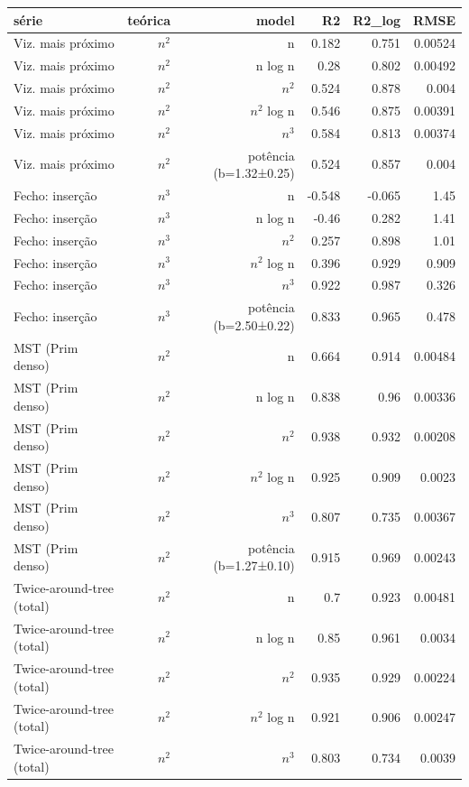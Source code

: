 \begin{tabular}{lrrrrr}
\hline
série & teórica & model & R2 & R2\_log & RMSE \\
\hline
Viz. mais próximo & $n^{2}$ & n & 0.182 & 0.751 & 0.00524 \\
Viz. mais próximo & $n^{2}$ & n log n & 0.28 & 0.802 & 0.00492 \\
Viz. mais próximo & $n^{2}$ & $n^{2}$ & 0.524 & 0.878 & 0.004 \\
Viz. mais próximo & $n^{2}$ & $n^{2}$ log n & 0.546 & 0.875 & 0.00391 \\
Viz. mais próximo & $n^{2}$ & $n^{3}$ & 0.584 & 0.813 & 0.00374 \\
Viz. mais próximo & $n^{2}$ & potência (b=1.32±0.25) & 0.524 & 0.857 & 0.004 \\
Fecho: inserção & $n^{3}$ & n & -0.548 & -0.065 & 1.45 \\
Fecho: inserção & $n^{3}$ & n log n & -0.46 & 0.282 & 1.41 \\
Fecho: inserção & $n^{3}$ & $n^{2}$ & 0.257 & 0.898 & 1.01 \\
Fecho: inserção & $n^{3}$ & $n^{2}$ log n & 0.396 & 0.929 & 0.909 \\
Fecho: inserção & $n^{3}$ & $n^{3}$ & 0.922 & 0.987 & 0.326 \\
Fecho: inserção & $n^{3}$ & potência (b=2.50±0.22) & 0.833 & 0.965 & 0.478 \\
MST (Prim denso) & $n^{2}$ & n & 0.664 & 0.914 & 0.00484 \\
MST (Prim denso) & $n^{2}$ & n log n & 0.838 & 0.96 & 0.00336 \\
MST (Prim denso) & $n^{2}$ & $n^{2}$ & 0.938 & 0.932 & 0.00208 \\
MST (Prim denso) & $n^{2}$ & $n^{2}$ log n & 0.925 & 0.909 & 0.0023 \\
MST (Prim denso) & $n^{2}$ & $n^{3}$ & 0.807 & 0.735 & 0.00367 \\
MST (Prim denso) & $n^{2}$ & potência (b=1.27±0.10) & 0.915 & 0.969 & 0.00243 \\
Twice-around-tree (total) & $n^{2}$ & n & 0.7 & 0.923 & 0.00481 \\
Twice-around-tree (total) & $n^{2}$ & n log n & 0.85 & 0.961 & 0.0034 \\
Twice-around-tree (total) & $n^{2}$ & $n^{2}$ & 0.935 & 0.929 & 0.00224 \\
Twice-around-tree (total) & $n^{2}$ & $n^{2}$ log n & 0.921 & 0.906 & 0.00247 \\
Twice-around-tree (total) & $n^{2}$ & $n^{3}$ & 0.803 & 0.734 & 0.0039 \\

\end{tabular}
